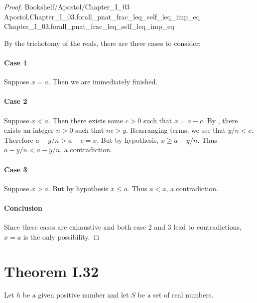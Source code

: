 \documentclass{article}
\newcommand{\link}[1]{\lean{../..}
  {Bookshelf/Apostol/Chapter\_I\_03} %
  {Apostol.Chapter\_I\_03.#1} %
  {Chapter\_I\_03.#1} %
}
\begin{document}
\begin{proof}

  \link{forall\_pnat\_frac\_leq\_self\_leq\_imp\_eq}

  \divider

  By the trichotomy of the reals, there are three cases to consider:

  \paragraph{Case 1}%

    Suppose $x = a$.
    Then we are immediately finished.

  \paragraph{Case 2}%

    Suppose $x < a$.
    Then there exists some $c > 0$ such that $x = a - c$.
    By , there exists an integer $n > 0$ such that
      $nc > y$.
    Rearranging terms, we see that $y / n < c$.
    Therefore $a - y / n > a - c = x$.
    But by hypothesis, $x \geq a - y / n$.
    Thus $a - y / n < a - y / n$, a contradiction.

  \paragraph{Case 3}%

    Suppose $x > a$.
    But by hypothesis $x \leq a$.
    Thus $a < a$, a contradiction.

  \paragraph{Conclusion}%

    Since these cases are exhaustive and both case 2 and 3 lead to
      contradictions, $x = a$ is the only possibility.

\end{proof}

\section*{Theorem I.32}%
%

Let $h$ be a given positive number and let $S$ be a set of real numbers.

\subsection*{}%
%
\end{document}
